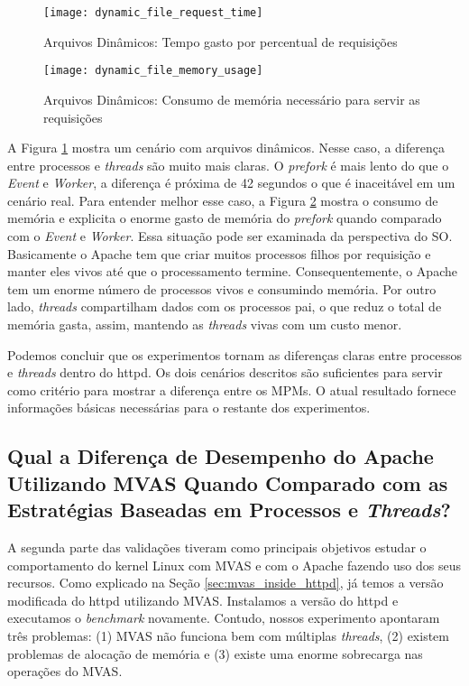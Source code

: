 \begin{figure}[!h]
  \centering
  \texttt{[image: dynamic\_file\_request\_time]}

  \caption{Arquivos Dinâmicos: Tempo gasto por percentual de requisições}
  \label{fig:dynamic_file}
\end{figure}

\begin{figure}[!h]
  \centering
  \texttt{[image: dynamic\_file\_memory\_usage]}

  \caption{Arquivos Dinâmicos: Consumo de memória necessário para servir as requisições}
  \label{fig:dynamic_file_memory}
\end{figure}

A Figura \ref{fig:dynamic_file} mostra um cenário com arquivos dinâmicos. Nesse
caso, a diferença entre processos e \emph{threads} são muito mais claras. O
\emph{prefork} é mais lento do que o \emph{Event} e \emph{Worker}, a
diferença é próxima de 42 segundos o que é inaceitável em um cenário real.
Para entender melhor esse caso, a Figura \ref{fig:dynamic_file_memory} mostra o
consumo de memória e explicita o enorme gasto de memória do \emph{prefork}
quando comparado com o \emph{Event} e \emph{Worker}. Essa situação pode ser
examinada da perspectiva do SO. Basicamente o Apache tem que criar muitos
processos filhos por requisição e manter eles vivos até que o processamento
termine. Consequentemente, o Apache tem um enorme número de processos vivos e
consumindo memória. Por outro lado, \emph{threads} compartilham dados com os
processos pai, o que reduz o total de memória gasta, assim, mantendo as
\emph{threads} vivas com um custo menor.

Podemos concluir que os experimentos tornam as diferenças claras entre
processos e \emph{threads} dentro do httpd. Os dois cenários descritos são
suficientes para servir como critério para mostrar a diferença entre os MPMs. O
atual resultado fornece informações básicas necessárias para o restante dos
experimentos.

\subsection{Qual a Diferença de Desempenho do Apache Utilizando MVAS Quando
Comparado com as Estratégias Baseadas em Processos e \emph{Threads}?}

A segunda parte das validações tiveram como principais objetivos estudar o
comportamento do kernel Linux com MVAS e com o Apache fazendo uso dos seus
recursos. Como explicado na Seção \ref{sec:mvas_inside_httpd}, já temos a
versão modificada do httpd utilizando MVAS. Instalamos a versão do httpd e
executamos o \emph{benchmark} novamente. Contudo, nossos experimento apontaram
três problemas: (1) MVAS não funciona bem com múltiplas \emph{threads}, (2)
existem problemas de alocação de memória e (3) existe uma enorme sobrecarga nas
operações do MVAS.

